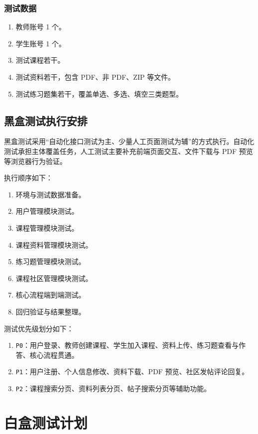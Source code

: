 \documentclass[12pt,a4paper]{ctexart}
\begin{document}
\subsubsection{测试数据}

\begin{enumerate}
  \item 教师账号 1 个。
  \item 学生账号 1 个。
  \item 测试课程若干。
  \item 测试资料若干，包含 PDF、非 PDF、ZIP 等文件。
  \item 测试练习题集若干，覆盖单选、多选、填空三类题型。
\end{enumerate}

\subsection{黑盒测试执行安排}

黑盒测试采用“自动化接口测试为主、少量人工页面测试为辅”的方式执行。自动化测试承担主体覆盖任务，人工测试主要补充前端页面交互、文件下载与 PDF 预览等浏览器行为验证。

执行顺序如下：

\begin{enumerate}
  \item 环境与测试数据准备。
  \item 用户管理模块测试。
  \item 课程管理模块测试。
  \item 课程资料管理模块测试。
  \item 练习题管理模块测试。
  \item 课程社区管理模块测试。
  \item 核心流程端到端测试。
  \item 回归验证与结果整理。
\end{enumerate}

测试优先级划分如下：

\begin{enumerate}
  \item \texttt{P0}：用户登录、教师创建课程、学生加入课程、资料上传、练习题查看与作答、核心流程贯通。
  \item \texttt{P1}：用户注册、个人信息修改、资料下载、PDF 预览、社区发帖评论回复。
  \item \texttt{P2}：课程搜索分页、资料列表分页、帖子搜索分页等辅助功能。
\end{enumerate}

\section{白盒测试计划}
\end{document}

